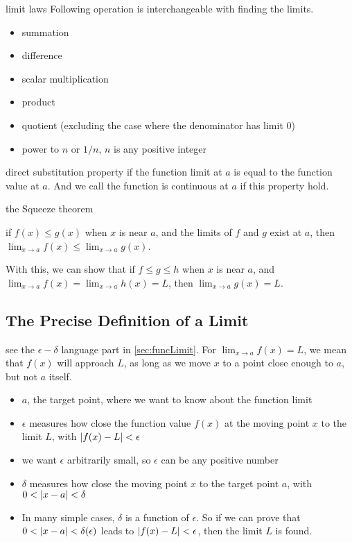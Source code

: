 \documentclass[Calculus 1 Recitation.tex]{subfiles}
\begin{document}
\begin{myleftlinebox}
	limit laws
	\tcblower
	Following operation is interchangeable with finding the limits.
	\begin{itemize}
		\item summation
		\item difference
		\item scalar multiplication
		\item product
		\item quotient (excluding the case where the denominator has limit $0$)
		\item power to $n$ or $1/n$, $n$ is any positive integer
	\end{itemize}
\end{myleftlinebox}

\begin{myleftlinebox}
	direct substitution property
	\tcblower
	if the function limit at $a$ is equal to the function value at $a$. And we call the function is continuous at $a$ if this property hold.
\end{myleftlinebox}

\begin{myleftlinebox}
	the Squeeze theorem
	\tcblower
	\begin{lemma}
		if $f(x)\leq g(x)$ when $x$ is near $a$, and the limits of $f$ and $g$ exist at $a$, then $\lim_{x\to a} f(x)\leq \lim_{x\to a} g(x)$.
	\end{lemma}
	\begin{theorem}
		With this, we can show that if $f\leq g\leq h$ when $x$ is near $a$, and $\lim_{x\to a} f(x) = \lim_{x\to a} h(x)=L$, then $\lim_{x\to a} g(x)=L$.
	\end{theorem}
\end{myleftlinebox}


\subsection{The Precise Definition of a Limit}

see the $\epsilon-\delta$ language part in \autoref{sec:funcLimit}. For $\lim_{x\to a}f(x)=L$, we mean that $f(x)$ will approach $L$, as long as we move $x$ to a point close enough to $a$, but not $a$ itself.

\begin{itemize}
	\item $a$, the target point, where we want to know about the function limit
	\item $\epsilon$ measures how close the function value $f(x)$ at the moving point $x$ to the limit $L$, with $\left\vert f(x)-L\right\vert<\epsilon$
	\item  we want $\epsilon$ arbitrarily small, so $\epsilon$ can be any positive number
	\item $\delta$ measures how close the moving point $x$ to the target point $a$, with $0<\left\vert x-a\right\vert<\delta$
	\item In many simple cases, $\delta$ is a function of $\epsilon$. So if we can prove that $0<\left\vert x-a\right\vert<\delta(\epsilon)$ leads to $\left\vert f(x)-L\right\vert<\epsilon$, then the limit $L$ is found.
\end{itemize}
\end{document}
